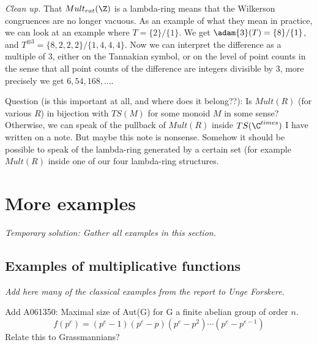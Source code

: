 \documentclass[a4paper]{article}
\begin{document}
\begin{example}
\emph{Clean up.} That $Mult_{rat}(\Z)$ is a lambda-ring means that the Wilkerson congruences are no longer vacuous. As an example of what they mean in practice, we can look at an example where $T = \{   2 \}  /  \{ 1    \}$. We get $\adam{3}(T) = \{   8 \}  /  \{ 1    \}$, and $T^{\otimes 3} = \{   8, 2, 2, 2 \}  /  \{ 1, 4, 4, 4    \}$. Now we can interpret the difference as a multiple of 3, either on the Tannakian symbol, or on the level of point counts in the sense that all point counts of the difference are integers divisible by 3, more precisely we get $6, 54, 168, \ldots$.
\end{example}



Question (is this important at all, and where does it belong??): Is $Mult(R)$ (for various $R$) in bijection with $TS(M)$ for some monoid $M$ in some sense? Otherwise, we can speak of the pullback of $Mult(R)$ inside $TS(\C^{times})$ I have written on a note. But maybe this note is nonsense. Somehow it should be possible to speak of the lambda-ring generated by a certain set (for example $Mult(R)$ inside one of our four lambda-ring structures.

\section{More examples}

\emph{Temporary solution: Gather all examples in this section.}

\subsection{Examples of multiplicative functions}


\emph{Add here many of the classical examples from the report to Unge Forskere.}



\begin{example}
Add A061350: Maximal size of Aut(G) for G a finite abelian group of order $n$. 
$$  f(p^e) = (p^e-1)(p^e-p)(p^e-p^2)\cdots (p^e-p^{e-1})   $$
Relate this to Grassmannians?
\end{example}
\end{document}
